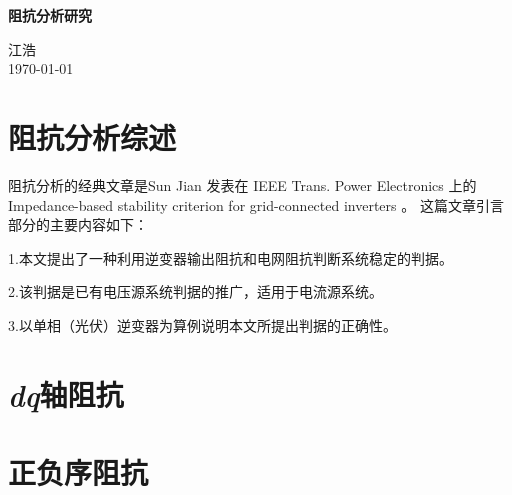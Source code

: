\documentclass[12pt, a4paper, UTF8, fontset=adobe, scheme=chinese, heading=true, oneside]{ctexbook} %
\begin{document}
\frontmatter
\begin{titlepage}
\begin{center}

\vspace*{5cm}
{\huge \bfseries 阻抗分析研究}\\[0.4cm]

\vspace{12cm}

{\large 江浩} \\[1cm]
{\large \today}

\end{center}
\end{titlepage}

\begin{titlepage}
\begin{center}

\vspace*{8cm}

\end{center}
\end{titlepage}

{
\hypersetup{linkcolor=black} %
\tableofcontents %
}

\mainmatter %

\chapter{阻抗分析综述}

阻抗分析的经典文章是Sun Jian 发表在 IEEE Trans. Power Electronics 上的
Impedance-based stability criterion for grid-connected inverters \cite{sun2011}。
这篇文章引言部分的主要内容如下：

1.本文提出了一种利用逆变器输出阻抗和电网阻抗判断系统稳定的判据。

2.该判据是已有电压源系统判据的推广，适用于电流源系统。

3.以单相（光伏）逆变器为算例说明本文所提出判据的正确性。 

\chapter{\textit{dq}轴阻抗}

\chapter{正负序阻抗}
\end{document}
